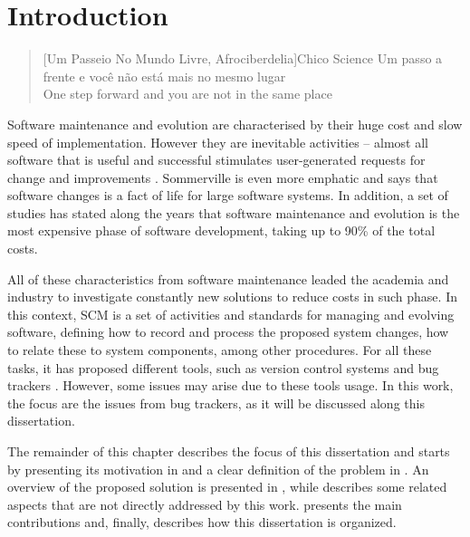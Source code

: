 \chapter{Introduction}
\label{ch:introduction}

\begin{quotation}[Um Passeio No Mundo Livre, Afrociberdelia]{Chico Science}
Um passo a frente e você não está mais no mesmo lugar\\
One step forward and you are not in the same place
\end{quotation}

Software maintenance and evolution are characterised by their huge cost and
slow speed of implementation. However they are inevitable activities -- almost
all software that is useful and successful stimulates user-generated requests for
change and improvements \citep{Bennett2000}. Sommerville
\citep{Sommerville2007} is even more emphatic and says that software changes
is a fact of life for large software systems. In addition, a set of studies
\citep{Huff1990,Moad1990,Eastwood1993,Erlikh2000} has stated along the years
that software maintenance and evolution is the most expensive phase of
software development, taking up to 90\% of the total costs.

All of these characteristics from software maintenance leaded the academia and
industry to investigate constantly new solutions to reduce costs in such
phase. In this context, \acf{SCM} is a set of
activities and standards for managing and evolving software, defining how to
record and process the proposed system changes, how to relate these to system
components, among other procedures. For all these tasks, it has proposed
different tools, such as version control systems and bug trackers
\citep{Sommerville2007}. However, some issues may arise due to these tools
usage. In this work, the focus are the issues from bug trackers, as
it will be discussed along this dissertation.

The remainder of this chapter describes the focus of this dissertation and
starts by presenting its motivation in  and a clear
definition of the problem in . An overview of the proposed
solution is presented in , while 
describes some related aspects that are not directly addressed by this work.
 presents the main contributions and, finally,
 describes how this dissertation is organized.


